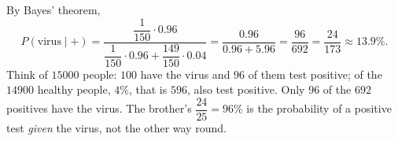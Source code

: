 By Bayes' theorem,
\[
P(\text{virus}\mid +)=\dfrac{\dfrac{1}{150}\cdot0.96}{\dfrac{1}{150}\cdot0.96+\dfrac{149}{150}\cdot0.04}=\dfrac{0.96}{0.96+5.96}=\dfrac{96}{692}=\boxed{\dfrac{24}{173}}\approx13.9\%.
\]
Think of $15000$ people: $100$ have the virus and $96$ of them test positive; of the $14900$ healthy people, $4\%$, that is $596$, also test positive. Only $96$ of the $692$ positives have the virus. The brother's $\dfrac{24}{25}=96\%$ is the probability of a positive test \emph{given} the virus, not the other way round.
